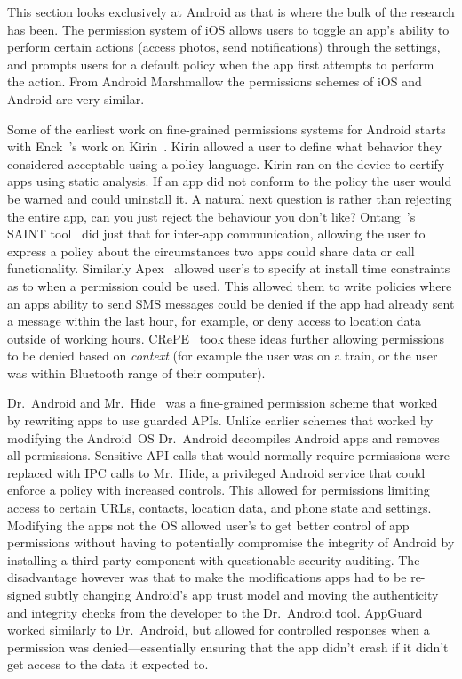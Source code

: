 \documentclass[thesis.tex]{subfiles}
\begin{document}
This section looks exclusively at Android as that is where the bulk of
the research has been.  The permission system of iOS allows users to
toggle an app's ability to perform certain actions (access photos,
send notifications) through the settings, and prompts users for a
default policy when the app first attempts to perform the action.
From Android Marshmallow the permissions schemes of iOS and Android
are very similar.

Some of the earliest work on fine-grained permissions systems for
Android starts with Enck~\etal's work on
Kirin~\cite{enck_lightweight_2009}.  Kirin allowed a user to define
what behavior they considered acceptable using a policy language.
Kirin ran on the device to certify apps using static analysis.  If an
app did not conform to the policy the user would be warned and could
uninstall it.  A natural next question is rather than rejecting the
entire app, can you just reject the behaviour you don't like?
Ontang~\etal's SAINT tool~\cite{ongtang_semantically_2012} did just
that for inter-app communication, allowing the user to express a
policy about the circumstances two apps could share data or call
functionality.  Similarly Apex~\cite{nauman_apex:_2010} allowed user's
to specify at install time constraints as to when a permission could
be used.  This allowed them to write policies where an apps ability to
send SMS messages could be denied if the app had already sent a
message within the last hour, for example, or deny access to location
data outside of working hours.  CRePE~\cite{conti_crepe:_2010} took
these ideas further allowing permissions to be denied based on
\emph{context} (for example the user was on a train, or the user was
within Bluetooth range of their computer).

Dr{.}~Android and Mr{.}~Hide~\cite{jeon_dr._2012} was a fine-grained
permission scheme that worked by rewriting apps to use guarded APIs.
Unlike earlier schemes that worked by modifying the Android~OS
Dr{.}~Android decompiles Android apps and removes all permissions.
Sensitive API calls that would normally require permissions were
replaced with IPC calls to Mr{.}~Hide, a privileged Android service
that could enforce a policy with increased controls.  This allowed for
permissions limiting access to certain URLs, contacts, location data,
and phone state and settings.  Modifying the apps not the OS allowed
user's to get better control of app permissions without having to
potentially compromise the integrity of Android by installing a
third-party component with questionable security auditing. The
disadvantage however was that to make the modifications apps had to be
re-signed subtly changing Android's app trust model and moving the
authenticity and integrity checks from the developer to the
Dr{.}~Android tool.  AppGuard~\cite{backes_appguard_2013} worked
similarly to Dr{.}~Android, but allowed for controlled responses when
a permission was denied---essentially ensuring that the app didn't
crash if it didn't get access to the data it expected to.
\end{document}
